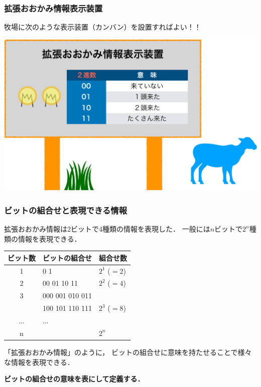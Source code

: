 \documentclass[handout]{beamer}        %
\begin{document}
\begin{frame}
  \frametitle{拡張おおかみ情報表示装置}
  牧場に次のような表示装置（カンバン）を設置すればよい！！
  \vfill
  \begin{center}
    \includegraphics[scale=0.35]{Fig/display2-crop.pdf}
    \vfill
  \end{center}
\end{frame}

\begin{frame}
  \frametitle{ビットの組合せと表現できる情報}
  拡張おおかみ情報は2ビットで4種類の情報を表現した．
  一般には$n$ビットで$2^n$種類の情報を表現できる．
  \begin{center}
    {\small\begin{tabular}{c|l|l} \hline\hline
      ビット数 & \multicolumn{1}{c|}{ビットの組合せ} & 組合せ数\\
      \hline
      1 & 0 1   & $2^1$ ($=2$) \\
      2 & 00 01 10 11 & $2^2$ ($=4$) \\
      3 & 000 001 010 011 &   \\
      & 100 101 110 111 & $2^3$ ($=8$) \\
      ...& ... &\\
      n &  & $2^n$ \\
    \end{tabular}}
  \end{center}

  「拡張おおかみ情報」のように，
  ビットの組合せに意味を持たせることで様々な情報を表現できる．
  \begin{center}
    {\bf ビットの組合せの意味を表にして定義する．}
  \end{center}
\end{frame}
\end{document}
